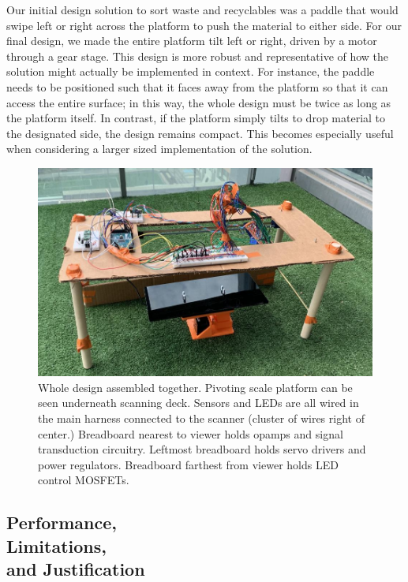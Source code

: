 \documentclass[12pt]{article}
\begin{document}
\begin{multicols*}{2}
            Our initial design solution to sort waste and recyclables was a paddle that would swipe left or right across the platform to push the material to either side. For our final design, we made the entire platform tilt left or right, driven by a motor through a gear stage. This design is more robust and representative of how the solution might actually be implemented in context. For instance, the paddle needs to be positioned such that it faces away from the platform so that it can access the entire surface; in this way, the whole design must be twice as long as the platform itself. In contrast, if the platform simply tilts to drop material to the designated side, the design remains compact. This becomes especially useful when considering a larger sized implementation of the solution.

            \begin{figure}[H]
                \centering\includegraphics[width=\linewidth]{WholeDesignGrass.png}
                \captionsetup{width=\linewidth}
                \caption{Whole design assembled together. Pivoting scale platform can be seen underneath scanning deck. Sensors and LEDs are all wired in the main harness connected to the scanner (cluster of wires right of center.) Breadboard nearest to viewer holds opamps and signal transduction circuitry. Leftmost breadboard holds servo drivers and power regulators. Breadboard farthest from viewer holds LED control MOSFETs.}
            \end{figure}

        
            

        \subsection{Performance, \\Limitations, \\and Justification} \label{subsec:PerformanceLimitationsJustification}


\end{multicols*}
\end{document}
